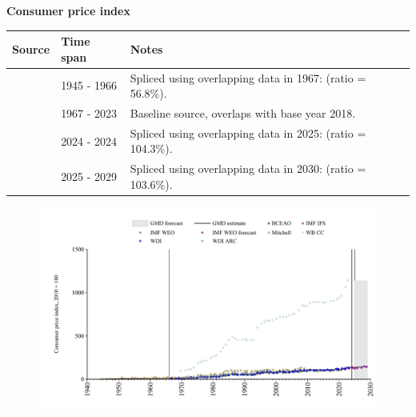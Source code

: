 \documentclass[12pt,a4paper,landscape]{article}
\begin{document}
\begin{adjustbox}{max totalsize={\paperwidth}{\paperheight},center}
\begin{minipage}[t][\textheight][t]{\textwidth}
\vspace*{0.5cm}
{}
\begin{center}
{\Large\bfseries Consumer price index}
\end{center}
\vspace{0.5cm}
\begin{table}[H]
\centering
\small
\begin{tabular}{|l|l|l|}
\hline
\textbf{Source} & \textbf{Time span} & \textbf{Notes} \\
\hline
\rowcolor{white}\cite{Mitchell}& 1945 - 1966 &Spliced using overlapping data in 1967: (ratio = 56.8\%). \\
\rowcolor{lightgray}\cite{WDI}& 1967 - 2023 &Baseline source, overlaps with base year 2018. \\
\rowcolor{white}\cite{BCEAO}& 2024 - 2024 &Spliced using overlapping data in 2025: (ratio = 104.3\%). \\
\rowcolor{lightgray}\cite{IMF_WEO_forecast}& 2025 - 2029 &Spliced using overlapping data in 2030: (ratio = 103.6\%). \\
\hline
\end{tabular}
\end{table}
\begin{figure}[H]
\centering
\includegraphics[width=\textwidth,height=0.6\textheight,keepaspectratio]{graphs/SEN_CPI.pdf}
\end{figure}
\end{minipage}
\end{adjustbox}
\end{document}
